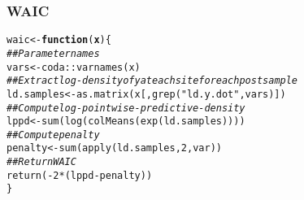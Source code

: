 \documentclass[color=usenames,dvipsnames]{beamer}\usepackage[]{graphicx}\usepackage[]{color}
\makeatletter
\newcommand{\hlnum}[1]{\textcolor[rgb]{0.69,0.494,0}{#1}}%
\newcommand{\hlstr}[1]{\textcolor[rgb]{0.749,0.012,0.012}{#1}}%
\newcommand{\hlcom}[1]{\textcolor[rgb]{0.514,0.506,0.514}{\textit{#1}}}%
\newcommand{\hlopt}[1]{\textcolor[rgb]{0,0,0}{#1}}%
\newcommand{\hlstd}[1]{\textcolor[rgb]{0,0,0}{#1}}%
\newcommand{\hlkwa}[1]{\textcolor[rgb]{0,0,0}{\textbf{#1}}}%
\newcommand{\hlkwb}[1]{\textcolor[rgb]{0,0.341,0.682}{#1}}%
\newcommand{\hlkwc}[1]{\textcolor[rgb]{0,0,0}{\textbf{#1}}}%
\newcommand{\hlkwd}[1]{\textcolor[rgb]{0.004,0.004,0.506}{#1}}%
\newenvironment{kframe}{%
 \def\at@end@of@kframe{}%
 \ifinner\ifhmode%
  \def\at@end@of@kframe{\end{minipage}}%
  \begin{minipage}{\columnwidth}%
 \fi\fi%
 \def\FrameCommand##1{\hskip\@totalleftmargin \hskip-\fboxsep
 \colorbox{shadecolor}{##1}\hskip-\fboxsep
     \hskip-\linewidth \hskip-\@totalleftmargin \hskip\columnwidth}%
 \MakeFramed {\advance\hsize-\width
   \@totalleftmargin\z@ \linewidth\hsize
   \@setminipage}}%
 {\par\unskip\endMakeFramed%
 \at@end@of@kframe}
\newenvironment{knitrout}{}{} %
\makeatother
\begin{document}
\begin{frame}[fragile]
  \frametitle{WAIC}

\begin{knitrout}\footnotesize
{}\color{fgcolor}\begin{kframe}
\begin{alltt}
\hlstd{waic} \hlkwb{<-} \hlkwa{function}\hlstd{(}\hlkwc{x}\hlstd{) \{}
    \hlcom{## Parameter names}
    \hlstd{vars} \hlkwb{<-} \hlstd{coda}\hlopt{::}\hlkwd{varnames}\hlstd{(x)}
    \hlcom{## Extract log-density of y at each site for each post sample}
    \hlstd{ld.samples} \hlkwb{<-} \hlkwd{as.matrix}\hlstd{(x[,}\hlkwd{grep}\hlstd{(}\hlstr{"ld.y.dot"}\hlstd{, vars)])}
    \hlcom{## Compute log-pointwise-predictive-density}
    \hlstd{lppd} \hlkwb{<-} \hlkwd{sum}\hlstd{(}\hlkwd{log}\hlstd{(}\hlkwd{colMeans}\hlstd{(}\hlkwd{exp}\hlstd{(ld.samples))))}
    \hlcom{## Compute penalty}
    \hlstd{penalty} \hlkwb{<-} \hlkwd{sum}\hlstd{(}\hlkwd{apply}\hlstd{(ld.samples,} \hlnum{2}\hlstd{, var))}
    \hlcom{## Return WAIC}
    \hlkwd{return}\hlstd{(}\hlopt{-}\hlnum{2}\hlopt{*}\hlstd{(lppd}\hlopt{-}\hlstd{penalty))}
\hlstd{\}}
\end{alltt}
\end{kframe}
\end{knitrout}
\end{frame}


\end{document}
